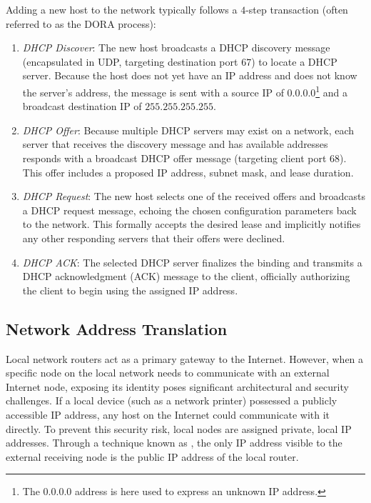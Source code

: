 Adding a new host to the network typically follows a \(4\)-step transaction (often referred to as the DORA process):
\begin{enumerate}
    \item \emph{DHCP Discover}: The new host broadcasts a DHCP discovery message (encapsulated in UDP, targeting destination port \(67\)) to locate a DHCP server. Because the host does not yet have an IP address and does not know the server's address, the message is sent with a source IP of \(0.0.0.0\)\footnote{The \(0.0.0.0\) address is here used to express an unknown IP address.} and a broadcast destination IP of \(255.255.255.255\).
    \item \emph{DHCP Offer}: Because multiple DHCP servers may exist on a network, each server that receives the discovery message and has available addresses responds with a broadcast DHCP offer message (targeting client port \(68\)). This offer includes a proposed IP address, subnet mask, and lease duration.
    \item \emph{DHCP Request}: The new host selects one of the received offers and broadcasts a DHCP request message, echoing the chosen configuration parameters back to the network. This formally accepts the desired lease and implicitly notifies any other responding servers that their offers were declined.
    \item \emph{DHCP ACK}: The selected DHCP server finalizes the binding and transmits a DHCP acknowledgment (ACK) message to the client, officially authorizing the client to begin using the assigned IP address.
\end{enumerate}
 
\subsection{Network Address Translation}
Local network routers act as a primary gateway to the Internet. However, when a specific node on the local network needs to communicate with an external Internet node, exposing its identity poses significant architectural and security challenges. If a local device (such as a network printer) possessed a publicly accessible IP address, any host on the Internet could communicate with it directly. To prevent this security risk, local nodes are assigned private, local IP addresses. Through a technique known as , the only IP address visible to the external receiving node is the public IP address of the local router.


